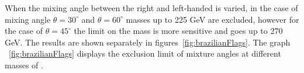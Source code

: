 When the mixing angle between the right and left-handed \wprime is varied, in the case of mixing angle $\theta=30^\circ$ and $\theta=60^\circ$ masses up to 225 GeV are excluded, however for the case of $\theta=45^\circ$ the limit on the mass is more sensitive and goes up to 270 GeV. The results are shown separately in figures~\ref{fig:brazilianFlags}. The graph ~\ref{fig:brazilianFlags} displays the exclusion limit of mixture angles at different masses of \wprime.

 

